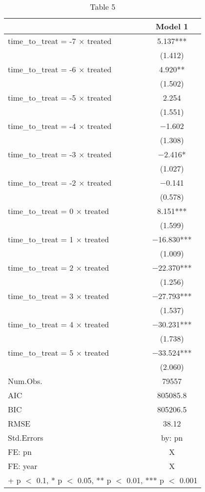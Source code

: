 \begin{table}

\caption{\label{tab:unnamed-chunk-1}Table 5}
\centering
\begin{tabular}[t]{lc}
\toprule
  & Model 1\\
\midrule
time\_to\_treat = -7 × treated & \num{5.137}***\\
 & (\num{1.412})\\
time\_to\_treat = -6 × treated & \num{4.920}**\\
 & (\num{1.502})\\
time\_to\_treat = -5 × treated & \num{2.254}\\
 & (\num{1.551})\\
time\_to\_treat = -4 × treated & \num{-1.602}\\
 & (\num{1.308})\\
time\_to\_treat = -3 × treated & \num{-2.416}*\\
 & (\num{1.027})\\
time\_to\_treat = -2 × treated & \num{-0.141}\\
 & (\num{0.578})\\
time\_to\_treat = 0 × treated & \num{8.151}***\\
 & (\num{1.599})\\
time\_to\_treat = 1 × treated & \num{-16.830}***\\
 & (\num{1.009})\\
time\_to\_treat = 2 × treated & \num{-22.370}***\\
 & (\num{1.256})\\
time\_to\_treat = 3 × treated & \num{-27.793}***\\
 & (\num{1.537})\\
time\_to\_treat = 4 × treated & \num{-30.231}***\\
 & (\num{1.738})\\
time\_to\_treat = 5 × treated & \num{-33.524}***\\
 & (\num{2.060})\\
\midrule
Num.Obs. & \num{79557}\\
AIC & \num{805085.8}\\
BIC & \num{805206.5}\\
RMSE & \num{38.12}\\
Std.Errors & by: pn\\
FE: pn & X\\
FE: year & X\\
\bottomrule
\multicolumn{2}{l}{\rule{0pt}{1em}+ p $<$ 0.1, * p $<$ 0.05, ** p $<$ 0.01, *** p $<$ 0.001}\\
\end{tabular}
\end{table}
